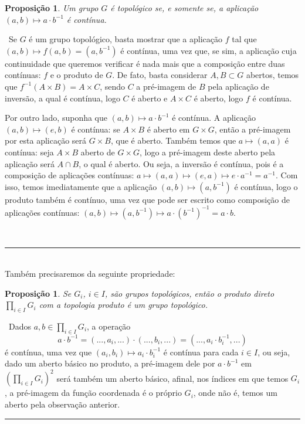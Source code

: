 \documentclass[12pt,a4paper]{article}
\newtheorem{prop}[mydef]{Proposição}
\def\dem{\par\smallbreak\noindent {\textit{ Demonstração:}} \ }
\def\eop{\hfill\rule{2.5mm}{2.5mm} \\ }
\theoremstyle{definition}
\begin{document}
\begin{prop}

    Um grupo $G$ é topológico se, e somente se, a aplicação $(a,b)\mapsto a\cdot b^{-1}$ é contínua. 

\end{prop}

\dem Se $G$ é um grupo topológico, basta mostrar que a aplicação $f$ tal que $(a,b)\mapsto f(a,b)=(a,b^{-1})$ é contínua, uma vez que, se sim, a aplicação cuja continuidade que queremos verificar é nada mais que a composição entre duas contínuas: $f$ e o produto de $G$. De fato, basta considerar $A,B\subset G$ abertos, temos que $f^{-1}(A\times B)=A\times C$, sendo $C$ a pré-imagem de $B$ pela aplicação de inversão, a qual é contínua, logo $C$ é aberto e $A\times C$ é aberto, logo $f$ é contínua.

Por outro lado, suponha que $(a,b)\mapsto a\cdot b^{-1}$ é contínua. A aplicação $(a,b)\mapsto (e,b)$ é contínua: se $A\times B$ é aberto em $G\times G$, então a pré-imagem por esta aplicação será $G\times B$, que é aberto. Também temos que $a \mapsto (a,a)$ é contínua: seja $A\times B$ aberto de $G\times G$, logo a pré-imagem deste aberto pela aplicação será $A\cap B$, o qual é aberto. Ou seja, a inversão é contínua, pois é a composição de aplicações contínuas: $a\mapsto (a,a) \mapsto (e,a) \mapsto e\cdot a^{-1}=a^{-1}$. Com isso, temos imediatamente que a aplicação $(a,b)\mapsto (a,b^{-1})$ é contínua, logo o produto também é contínuo, uma vez que pode ser escrito como composição de aplicações contínuas: $(a,b)\mapsto (a,b^{-1})\mapsto a\cdot (b^{-1})^{-1}=a\cdot b$. 

\ \eop

Também precisaremos da seguinte propriedade: 

\begin{prop}

    Se $G_i$, $i\in I$, são grupos topológicos, então o produto direto $\prod_{i\in I} G_i$ com a topologia produto é um grupo topológico. \\

\end{prop}

\dem Dados $a,b \in \prod_{i\in I} G_i$, a operação $$a\cdot b ^{-1}=(... , a_i , ...)\cdot (... , b_i , ...)=(... , a_i \cdot b_i^{-1} , ...)$$ é contínua, uma vez que $(a_i,b_i)\mapsto a_i \cdot b_i^{-1}$ é contínua para cada $i\in I$, ou seja, dado um aberto básico no produto, a pré-imagem dele por $a\cdot b ^{-1}$ em $(\prod_{i\in I} G_i)^2$ será também um aberto básico, afinal, nos índices em que temos $G_i$, a pré-imagem da função coordenada é o próprio $G_i$, onde não é, temos um aberto pela observação anterior. \eop
\end{document}

